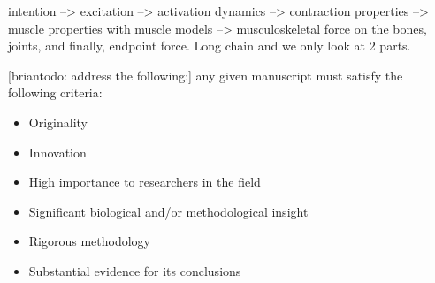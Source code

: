 intention --> excitation --> activation dynamics --> contraction properties --> muscle properties with muscle models --> musculoskeletal force on the bones, joints, and finally, endpoint force. Long chain and we only look at 2 parts.


[briantodo: address the following:]
any given manuscript must satisfy the following criteria:
\begin{itemize}
	\item {Originality}
	\item {Innovation}
	\item {High importance to researchers in the field}
	\item {Significant biological and/or methodological insight}
	\item {Rigorous methodology}
	\item {Substantial evidence for its conclusions}
\end{itemize}


